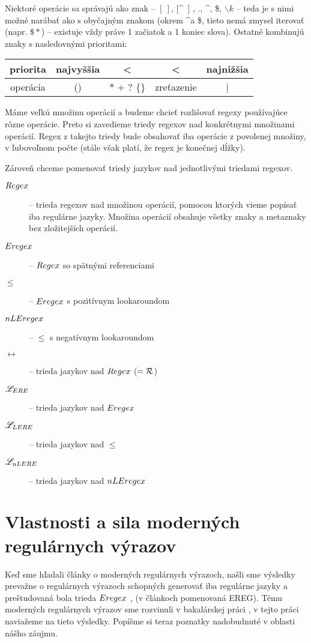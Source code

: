 Niektoré operácie sa správajú ako znak -- $\left[~\right]$, [\textasciicircum~] , ., \textasciicircum, \$, $\backslash k$ -- teda je s nimi možné narábať ako s obyčajným znakom (okrem \textasciicircum a \$, tieto nemá zmysel iterovať (napr. $\$*$) -- existuje vždy práve 1 začiatok a 1 koniec slova). Ostatné kombinujú znaky s nasledovnými prioritami:
\begin{center}
\begin{tabular}{|c||c|c|c|c|}
\hline
priorita &najvyššia&<&<& najnižšia  \\
\hline
operácia & () & $*$ + ? $\lbrace \rbrace$ & zreťazenie & | \\ \hline
\end{tabular}
\end{center}

Máme veľkú množinu operácií a budeme chcieť rozlišovať regexy používajúce rôzne operácie. Preto si zavedieme triedy regexov nad konkrétnymi množinami operácií. Regex z takejto triedy bude obsahovať iba operácie z povolenej množiny, v ľubovoľnom počte (stále však platí, že regex je konečnej dĺžky).

Zároveň chceme pomenovať triedy jazykov nad jednotlivými triedami regexov.

\begin{description}
\item[$Regex$] -- trieda regexov nad množinou operácií, pomocou ktorých vieme popísať iba regulárne jazyky. Množina operácií obsahuje všetky znaky a metaznaky bez zložitejších operácií.
\item[$Eregex$] -- $Regex$ so spätnými referenciami
\item[$\le$] -- $Eregex$ s pozitívnym lookaroundom
\item[$nLEregex$] -- $\le$ s negatívnym lookaroundom
\item[$\rel$] -- trieda jazykov nad $Regex$ ($= {\cal R}$)
\item[$\mathscr{L}_{ERE}$] -- trieda jazykov nad $Eregex$
\item[$\mathscr{L}_{LERE}$] -- trieda jazykov nad $\le$
\item[$\mathscr{L}_{nLERE}$] -- trieda jazykov nad $nLEregex$
\end{description}

\section[Vlastnosti a sila]{Vlastnosti a sila moderných regulárnych výrazov}
\label{usila}

Keď sme hľadali články o moderných regulárnych výrazoch, našli sme výsledky prevažne o regulárnych výrazoch schopných generovať iba regulárne jazyky a preštudovaná bola trieda $Eregex$ \cite{ExtendedRegexPower}, \cite{ExtendedRegexIntersec} (v článkoch pomenovaná EREG). Tému moderných regulárnych výrazov sme rozvinuli v bakalárskej práci \cite{mojaBak}, v tejto práci naviažeme na tieto výsledky. Popíšme si teraz poznatky nadobudnuté v oblasti nášho záujmu.

